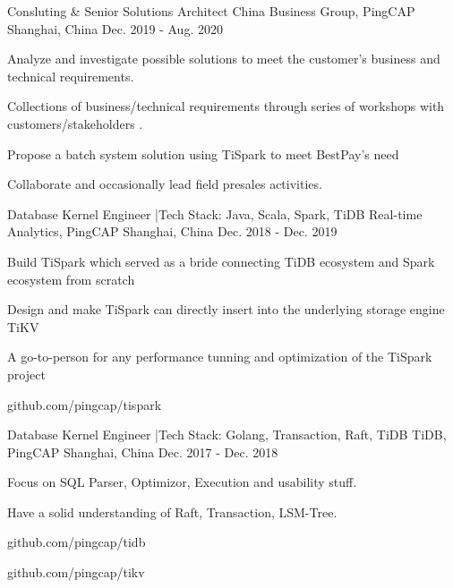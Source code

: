 \begin{cventries}
  \cventry
    {Consluting \& Senior Solutions Architect } %
    {China Business Group, PingCAP} %
    {Shanghai, China} %
    {Dec. 2019 - Aug. 2020} %
    {
      \begin{cvitems} %
        \item {Analyze and investigate possible solutions to meet the customer’s business and technical requirements.}
        \item {Collections of business/technical requirements through series of workshops with customers/stakeholders .}
        \item {Propose a batch system solution using TiSpark to meet BestPay's need}
        \item {Collaborate and occasionally lead field presales activities.}
      \end{cvitems}
    }

  \cventry
    {Database Kernel Engineer \enskip|\enskip Tech Stack: Java, Scala, Spark, TiDB} %
    {Real-time Analytics, PingCAP} %
    {Shanghai, China} %
    {Dec. 2018 - Dec. 2019} %
    {
      \begin{cvitems} %
        \item {Build TiSpark which served as a bride connecting TiDB ecosystem and Spark ecosystem from scratch}
        \item {Design and make TiSpark can directly insert into the underlying storage engine TiKV}
        \item {A go-to-person for any performance tunning and optimization of the TiSpark project}
        \item {github.com/pingcap/tispark}
      \end{cvitems}
    }

  \cventry
    {Database Kernel Engineer \enskip|\enskip Tech Stack: Golang, Transaction, Raft, TiDB} %
    {TiDB, PingCAP} %
    {Shanghai, China} %
    {Dec. 2017 - Dec. 2018} %
    {
      \begin{cvitems} %
        \item {Focus on SQL Parser, Optimizor, Execution and usability stuff.}
        \item {Have a solid understanding of Raft, Transaction, LSM-Tree.}
        \item {github.com/pingcap/tidb}
        \item {github.com/pingcap/tikv}
      \end{cvitems}
    }

\end{cventries}
